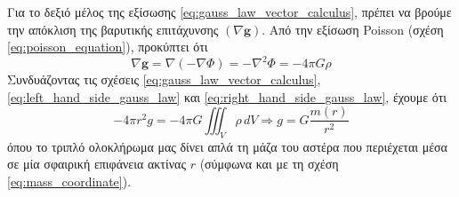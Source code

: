Για το δεξιό μέλος της εξίσωσης \eqref{eq:gauss_law_vector_calculus}, πρέπει να βρούμε την απόκλιση της βαρυτικής επιτάχυνσης $(\nabla \boldsymbol{g})$. Από την εξίσωση Poisson (σχέση \eqref{eq:poisson_equation}), προκύπτει ότι
\begin{equation}
    \label{eq:right_hand_side_gauss_law}
    \nabla \boldsymbol{g} = \nabla (- \nabla \Phi) = - \nabla^2 \Phi = - 4\pi G \rho
\end{equation}
Συνδυάζοντας τις σχέσεις \eqref{eq:gauss_law_vector_calculus}, \eqref{eq:left_hand_side_gauss_law} και \eqref{eq:right_hand_side_gauss_law}, έχουμε ότι
\begin{equation}
    -4 \pi r^2 g = -4 \pi G \iiint_V \rho \,dV \Rightarrow g = G \frac{m(r)}{r^2}
\end{equation}
όπου το τριπλό ολοκλήρωμα μας δίνει απλά τη μάζα του αστέρα που περιέχεται μέσα σε μία σφαιρική επιφάνεια ακτίνας $r$ (σύμφωνα και με τη σχέση \eqref{eq:mass_coordinate}).
